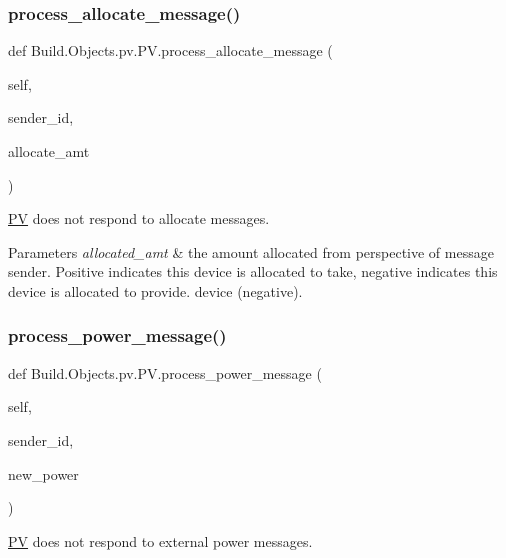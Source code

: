 \subsubsection{\texorpdfstring{process\+\_\+allocate\+\_\+message()}{process\_allocate\_message()}}
{\footnotesize\ttfamily def Build.\+Objects.\+pv.\+P\+V.\+process\+\_\+allocate\+\_\+message (\begin{DoxyParamCaption}\item[{}]{self,  }\item[{}]{sender\+\_\+id,  }\item[{}]{allocate\+\_\+amt }\end{DoxyParamCaption})}



\hyperlink{class_build_1_1_objects_1_1pv_1_1_p_v}{PV} does not respond to allocate messages. 


\begin{DoxyParams}{Parameters}
{\em allocated\+\_\+amt} & the amount allocated from perspective of message sender. Positive indicates this device is allocated to take, negative indicates this device is allocated to provide. device (negative). \\
\hline
\end{DoxyParams}
\mbox{\label{class_build_1_1_objects_1_1pv_1_1_p_v_a4e7810d5ba27d6414abca31af54d8949}} 
\subsubsection{\texorpdfstring{process\+\_\+power\+\_\+message()}{process\_power\_message()}}
{\footnotesize\ttfamily def Build.\+Objects.\+pv.\+P\+V.\+process\+\_\+power\+\_\+message (\begin{DoxyParamCaption}\item[{}]{self,  }\item[{}]{sender\+\_\+id,  }\item[{}]{new\+\_\+power }\end{DoxyParamCaption})}



\hyperlink{class_build_1_1_objects_1_1pv_1_1_p_v}{PV} does not respond to external power messages. 



